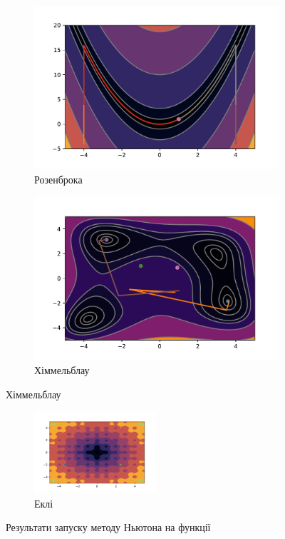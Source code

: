 \begin{figure}[h!]
    \begin{subfigure}{0.5\textwidth}
        \includegraphics[width=\textwidth, trim=1cm 0.5cm 1.3cm 1cm, clip]{assets/Newton/rosenbrock.pdf}
        \caption{Розенброка}
    \end{subfigure}
    \begin{subfigure}{0.5\textwidth}
        \includegraphics[width=\textwidth, trim=1cm 0.5cm 1.3cm 1cm, clip]{assets/Newton/himmelblau.pdf}
        \caption{Хіммельблау}
    \end{subfigure}
\end{figure}
\begin{figure}[h!]
    \ContinuedFloat
    \begin{subfigure}{\textwidth}
        \centering
        \includegraphics[width=0.5\textwidth, trim=1cm 0.5cm 1.3cm 1cm, clip]{assets/Newton/ackley.pdf}
        \caption{Еклі}
    \end{subfigure}
    \caption{Результати запуску методу Ньютона на функції}
\end{figure}

